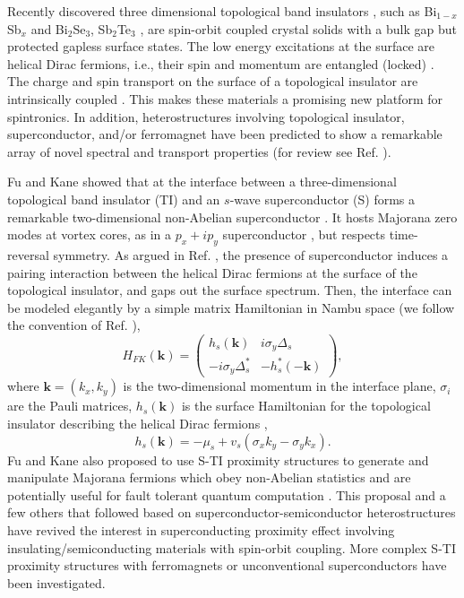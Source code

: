 \documentclass[12pt,twocolumn]{article}
\begin{document}
Recently discovered three dimensional topological band insulators \cite{fu07,moore,roy}, such as Bi$_{1-x}$Sb$_x$ \cite{Hsieh2008} and Bi$_2$Se$_3$, Sb$_2$Te$_3$ \cite{Xia09,zhang2009,Chen09}, are spin-orbit coupled crystal solids with a bulk gap but protected gapless surface states. The low energy excitations at the surface are helical Dirac fermions, i.e., their spin and momentum are entangled (locked) \cite{Hsieh2009}. The charge and spin transport on the surface of a topological insulator
are intrinsically coupled \cite{burkov}.
This makes these materials a promising new platform for spintronics. In addition, heterostructures involving topological insulator, superconductor, and/or ferromagnet have been predicted to show a remarkable array of novel spectral and transport properties (for review
see Ref. \cite{today,rmp,Qi-zhang-rev}). 


Fu and Kane showed that 
at the interface between a three-dimensional topological band insulator  (TI) and an 
$s$-wave superconductor (S) forms a remarkable two-dimensional non-Abelian superconductor \cite{f-k}.
It hosts Majorana zero modes at vortex cores, as in a 
$p_x+ip_y$ superconductor \cite{r-g}, but respects time-reversal symmetry. 
As argued in Ref. \cite{f-k}, the presence of superconductor induces a pairing interaction
between the helical Dirac fermions at the surface of the topological insulator,
and gaps out the surface spectrum. Then, the interface can be modeled elegantly by 
 a simple matrix Hamiltonian in Nambu space (we follow the convention of Ref. \cite{qi-zhang}),
\begin{equation}
H_{FK}(\mathbf{k})=\left(
\begin{array}{cc}
h_s(\mathbf{k})  &  i\sigma_y  \Delta_s \\
-i\sigma_y \Delta_s^*  &   -h_s^*(-\mathbf{k})
\end{array}\label{fkmodel}
\right),
\end{equation}
where $\mathbf{k}=(k_x,k_y)$ is the two-dimensional momentum in
the interface plane, $\sigma_i$ are the Pauli matrices,
$h_s(\mathbf{k})$ is the surface Hamiltonian
for the topological insulator describing the helical Dirac fermions \cite{qi-zhang,rmp},
\begin{equation}
h_s(\mathbf{k})=-\mu_s + v_s (\sigma_xk_y-\sigma_y k_x).
\end{equation}
Fu and Kane also proposed to use S-TI proximity structures to
generate and manipulate Majorana fermions which obey non-Abelian 
statistics and are potentially useful for fault tolerant quantum 
computation \cite{f-k}. 
This proposal and a few others that followed based on 
superconductor-semiconductor heterostructures \cite{roman,maryland,jason,mao1,mao2} have revived
the interest in superconducting proximity effect involving insulating/semiconducting 
materials with spin-orbit coupling. More complex S-TI proximity structures
with ferromagnets \cite{yu,jacF} or unconventional superconductors \cite{jacU} 
have been investigated.
\end{document}
